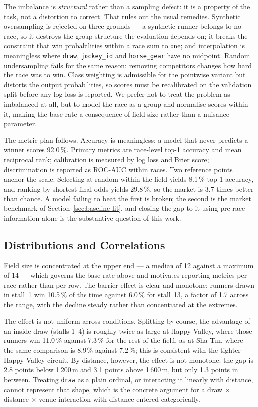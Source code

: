 The imbalance is \emph{structural} rather than a sampling defect: it is a
property of the task, not a distortion to correct. That rules out the
usual remedies. Synthetic oversampling is rejected on three grounds --- a
synthetic runner belongs to no race, so it destroys the group structure
the evaluation depends on; it breaks the constraint that win probabilities
within a race sum to one; and interpolation is meaningless where
\texttt{draw}, \texttt{jockey\_id} and \texttt{horse\_gear} have no
midpoint. Random undersampling fails for the same reason: removing
competitors changes how hard the race was to win. Class weighting is
admissible for the pointwise variant but distorts the output
probabilities, so scores must be recalibrated on the validation split
before any log loss is reported. We prefer not to treat the problem as
imbalanced at all, but to model the race as a group and normalise scores
within it, making the base rate a consequence of field size rather than a
nuisance parameter.

The metric plan follows. Accuracy is meaningless: a model that never
predicts a winner scores 92.0\,\%. Primary metrics are race-level top-1
accuracy and mean reciprocal rank; calibration is measured by log loss and
Brier score; discrimination is reported as ROC-AUC within races. Two
reference points anchor the scale. Selecting at random within the field
yields 8.1\,\% top-1 accuracy, and ranking by shortest final odds yields
29.8\,\%, so the market is 3.7 times better than chance. A model failing
to beat the first is broken; the second is the market benchmark of
Section~\ref{sec:baseline-lit}, and closing the gap to it using pre-race
information alone is the substantive question of this work.

\subsection{Distributions and Correlations}
\label{sec:distributions}

Field size is concentrated at the upper end --- a median of 12 against a
maximum of 14 --- which governs the base rate above and motivates
reporting metrics per race rather than per row. The barrier effect is
clear and monotone: runners drawn in stall~1 win 10.5\,\% of the time
against 6.0\,\% for stall~13, a factor of 1.7 across the range, with the
decline steady rather than concentrated at the extremes.

The effect is not uniform across conditions. Splitting by course, the
advantage of an inside draw (stalls 1--4) is roughly twice as large at
Happy Valley, where those runners win 11.0\,\% against 7.3\,\% for the
rest of the field, as at Sha Tin, where the same comparison is 8.9\,\%
against 7.2\,\%; this is consistent with the tighter Happy Valley
circuit. By distance, however, the effect is not monotone: the gap is
2.8 points below 1\,200\,m and 3.1 points above 1\,600\,m, but only
1.3 points in between. Treating \texttt{draw} as a plain ordinal, or
interacting it linearly with distance, cannot represent that shape, which
is the concrete argument for a draw $\times$ distance $\times$ venue
interaction with distance entered categorically.

